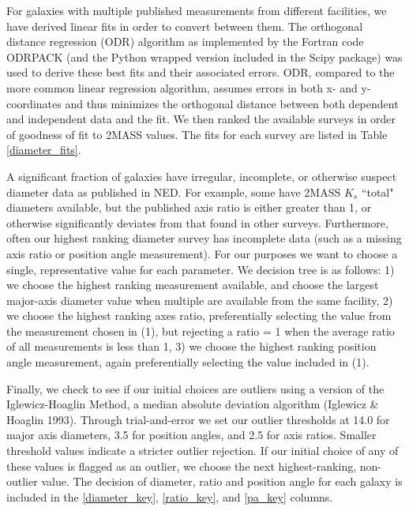 \documentclass[iop]{emulateapj-rtx4}
\begin{document}
For galaxies with multiple published measurements from different facilities, we have derived linear fits in order to convert between them. The orthogonal distance regression (ODR) algorithm as implemented by the Fortran code ODRPACK (and the Python wrapped version included in the Scipy package) was used to derive these best fits and their associated errors. ODR, compared to the more common linear regression algorithm, assumes errors in both x- and y-coordinates and thus minimizes the orthogonal distance between both dependent and independent data and the fit. We then ranked the available surveys in order of goodness of fit to 2MASS values. The fits for each survey are listed in Table \ref{diameter_fits}. 

A significant fraction of galaxies have irregular, incomplete, or otherwise suspect diameter data as published in NED. For example, some have 2MASS $K_s$ ``total" diameters available, but the published axis ratio is either greater than 1, or otherwise significantly deviates from that found in other surveys. Furthermore, often our highest ranking diameter survey has incomplete data (such as a missing axis ratio or position angle measurement). For our purposes we want to choose a single, representative value for each parameter. We decision tree is as follows: 1) we choose the highest ranking measurement available, and choose the largest major-axis diameter value when multiple are available from the same facility, 2) we choose the highest ranking axes ratio, preferentially selecting the value from the measurement chosen in (1), but rejecting a ratio = 1 when the average ratio of all measurements is less than 1, 3) we choose the highest ranking position angle measurement, again preferentially selecting the value included in (1). 

Finally, we check to see if our initial choices are outliers using a version of the Iglewicz-Hoaglin Method, a median absolute deviation algorithm (Iglewicz \& Hoaglin 1993). Through trial-and-error we set our outlier thresholds at 14.0 for major axis diameters, 3.5 for position angles, and 2.5 for axis ratios. Smaller threshold values indicate a stricter outlier rejection. If our initial choice of any of these values is flagged as an outlier, we choose the next highest-ranking, non-outlier value. The decision of diameter, ratio and position angle for each galaxy is included in the \ref{diameter_key}, \ref{ratio_key}, and \ref{pa_key} columns.


\end{document}
